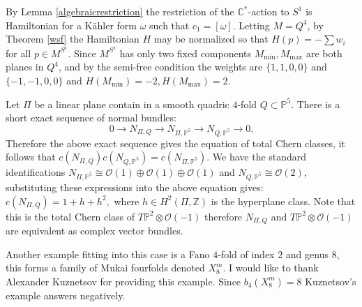 \documentclass[12pt]{article}
\begin{document}
By Lemma  \ref{algebraicrestriction} the restriction of the $\mathbb{C}^*$-action to $S^1$ is Hamiltonian for a K\"{a}hler form $\omega$ such that $c_1 = [\omega]$. Letting $M=Q^4$, by Theorem \ref{wsf} the Hamiltonian $H$ may be normalized so that $H(p) =- \sum w_i$ for all $p \in M^{S^1}$. Since $M^{S^1}$ has only two fixed components $M_{\min},M_{\max} $ are both planes in $Q^4$, and by the semi-free condition the weights are $\{1,1,0,0\}$ and $\{-1,-1,0,0\}$ and $H(M_{\min}) = -2, H(M_{\max}) = 2$.




Let $\Pi$ be a linear plane contain in a smooth quadric $4$-fold $Q \subset \mathbb{P}^5$. There is a short exact sequence of normal bundles: $$0 \rightarrow N_{\Pi,Q} \rightarrow N_{\Pi,\mathbb{P}^5} \rightarrow N_{Q,\mathbb{P}^5} \rightarrow 0.$$Therefore the above exact sequence gives the equation of total Chern classes, it follows that $c(N_{\Pi,Q})  c(N_{Q,\mathbb{P}^5}) = c(N_{\Pi,\mathbb{P}^5}) .  $ 
We have the standard identifications $N_{\Pi,\mathbb{P}^5} \cong \mathcal{O}(1) \oplus \mathcal{O}(1)  \oplus \mathcal{O}(1)$ and  $N_{Q,\mathbb{P}^5} \cong \mathcal{O}(2)$, substituting these expressions into the above equation gives:  $c(N_{\Pi,Q}) = 1+h + h^2, $ where $h \in H^{2}(\Pi,\mathbb{Z})$ is the hyperplane class. Note that this is the total Chern class of $T\mathbb{P}^2 \otimes \mathcal{O}(-1)$ therefore $N_{\Pi,Q}$ and $T\mathbb{P}^2 \otimes \mathcal{O}(-1)$ are equivalent as complex vector bundles.

Another example fitting into this case is a Fano $4$-fold of index $2$ and genus $8$, this forms a family of Mukai fourfolds denoted $X^{m}_{8}$. I would like to thank Alexander Kuznetsov for providing this example. Since $b_{4}(X^{m}_8)=8$ Kuznetsov's example answers \cite[Question 15.3]{PZ3} negatively.
\end{document}
